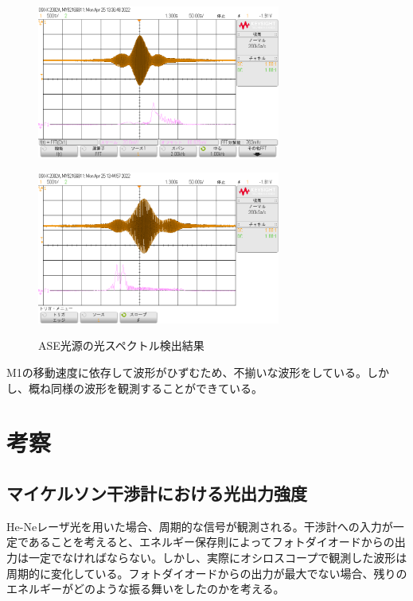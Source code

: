 \documentclass[uplatex, titlepage, fontsize=10pt, paper=a4paper]{jsarticle}
\numberwithin{equation}{section}
\begin{document}
\begin{figure}[h]
\begin{minipage}{0.5\textwidth}
\centering
\includegraphics[width = 8cm]{画像フォルダ/scope_1.png}
\label{graphic_day_2_sample_1}
\end{minipage}
\begin{minipage}{0.5\textwidth}
\centering
\includegraphics[width = 8cm]{画像フォルダ/scope_2.png}
\label{graphic_day_2_sample_2}
\end{minipage}
\caption{ASE光源の光スペクトル検出結果}
\label{graphics_day_2}
\end{figure}

M1の移動速度に依存して波形がひずむため、不揃いな波形をしている。しかし、概ね同様の波形を観測することができている。

\section{考察}

\subsection{マイケルソン干渉計における光出力強度}
He-Neレーザ光を用いた場合、周期的な信号が観測される。干渉計への入力が一定であることを考えると、エネルギー保存則によってフォトダイオードからの出力は一定でなければならない。しかし、実際にオシロスコープで観測した波形は周期的に変化している。フォトダイオードからの出力が最大でない場合、残りのエネルギーがどのような振る舞いをしたのかを考える。
\end{document}
